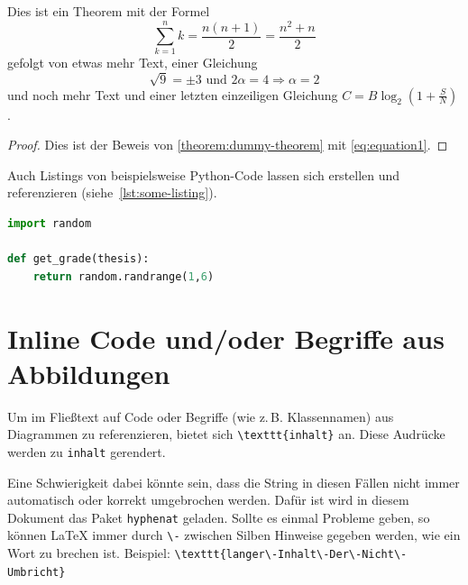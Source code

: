 
\begin{theorem}\label{theorem:dummy-theorem}
Dies ist ein Theorem mit der Formel
\begin{equation}
\label{eq:equation1}
\sum_{k=1}^n k=\frac{n(n+1)}{2}=\frac{n^2+n}{2}
\end{equation}
gefolgt von etwas mehr Text, einer Gleichung
$$\sqrt{9}=\pm3\text{ und }2\alpha=4\Rightarrow\alpha=2$$
und noch mehr Text und einer letzten einzeiligen Gleichung \(C = B \log_2 \left(1 + \frac{S}{N} \right) \).
\end{theorem}

\begin{proof}
Dies ist der Beweis von \cref{theorem:dummy-theorem} mit \cref{eq:equation1}.
\end{proof}


Auch Listings von beispielsweise Python-Code lassen sich erstellen und referenzieren
(siehe~\cref{lst:some-listing}).
\begin{lstlisting}[language=Python, caption=Python Listing, label=lst:some-listing]
import random
    
def get_grade(thesis):
    return random.randrange(1,6)
\end{lstlisting}


\section{Inline Code und/oder Begriffe aus Abbildungen}\label{sect-inline-code}

Um im Fließtext auf Code oder Begriffe (wie z.\,B. Klassennamen) aus Diagrammen zu referenzieren, bietet sich
\texttt{\textbackslash\-texttt\{inhalt\}}
an.
Diese Audrücke werden zu \texttt{inhalt} gerendert.

Eine Schwierigkeit dabei könnte sein, dass die String in diesen Fällen nicht immer automatisch oder korrekt umgebrochen werden.
Dafür ist wird in diesem Dokument das Paket \texttt{hyphenat} geladen.
Sollte es einmal Probleme geben, so können LaTeX immer durch \texttt{\textbackslash-} zwischen Silben Hinweise gegeben werden, wie ein Wort zu brechen ist.
Beispiel: \texttt{\textbackslash\-texttt\{langer\textbackslash-Inhalt\textbackslash-Der\textbackslash-Nicht\textbackslash-Umbricht\}}
